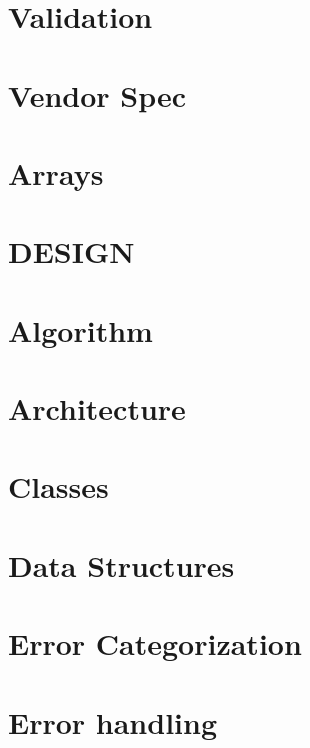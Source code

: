 \documentclass[twoside]{book}
\newcommand{\+}{\discretionary{\mbox{\scriptsize$\hookleftarrow$}}{}{}}
\begin{document}
\chapter{Validation}
\label{doc_decisions_validation_md}

\chapter{Vendor Spec}
\label{doc_decisions_vendor_spec_md}

\chapter{Arrays}
\label{doc_decisions_warning_array_md}

\chapter{D\+E\+S\+I\+GN}
\label{doc_DESIGN_md}

\chapter{Algorithm}
\label{doc_dev_algorithm_md}

\chapter{Architecture}
\label{doc_dev_architecture_md}

\chapter{Classes}
\label{doc_dev_classes_md}

\chapter{Data Structures}
\label{doc_dev_data-structures_md}

\chapter{Error Categorization}
\label{doc_dev_error-categorization_md}

\chapter{Error handling}
\label{doc_dev_error-handling_md}

\end{document}
